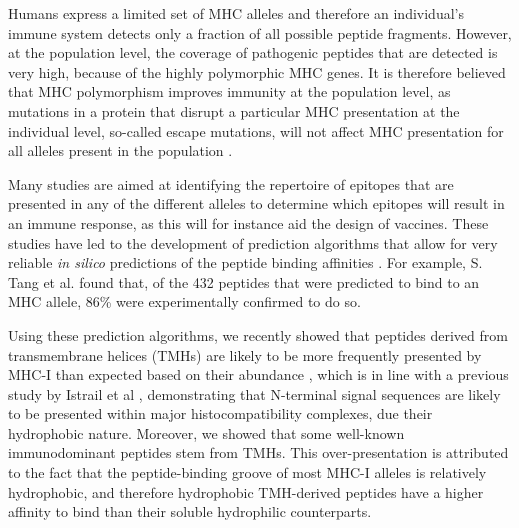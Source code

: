 \documentclass[utf8]{frontiersSCNS} %
\begin{document}

Humans express a limited set of MHC alleles
and therefore an individual's immune system detects 
only a fraction of all possible peptide fragments. 
However, at the population level, the coverage of pathogenic peptides that are detected 
is very high, because of the highly polymorphic MHC genes.
It is therefore believed that MHC polymorphism improves immunity at the population level, 
as mutations in a protein that disrupt a particular MHC presentation at the individual level, 
so-called escape mutations, 
will not affect MHC presentation for all alleles present in the population \citep{sommer2005importance}.


Many studies are aimed at identifying the repertoire of epitopes that are presented 
in any of the different alleles to determine which epitopes will result in an immune response, 
as this will for instance aid the design of vaccines. 
These studies have led to the development of prediction algorithms 
that allow for very reliable \emph{in silico} 
predictions of the peptide binding affinities
\citep{larsen2010identification,schellens2008unanticipated,tang2011genome}.
For example, S. Tang et al. \citep{tang2011genome} found that, 
of the 432 peptides that were predicted to bind to an MHC allele,
86\% were experimentally confirmed to do so. 


Using these prediction algorithms, 
we recently showed that peptides derived 
from transmembrane helices (TMHs) 
are likely to be more frequently presented by MHC-I 
than expected based on their abundance \citep{bianchi2017},
which is in line with a previous study 
by Istrail et al \citep{istrail2004comparative},
demonstrating that N-terminal signal sequences 
are likely to be presented within major histocompatibility complexes, 
due their hydrophobic nature. 
Moreover, we showed that some well-known immunodominant peptides stem from TMHs. 
This over-presentation is attributed to the fact 
that the peptide-binding groove of most MHC-I alleles
is relatively hydrophobic, 
and therefore hydrophobic TMH-derived peptides have a higher affinity 
to bind than their soluble hydrophilic 
counterparts. 
\end{document}
